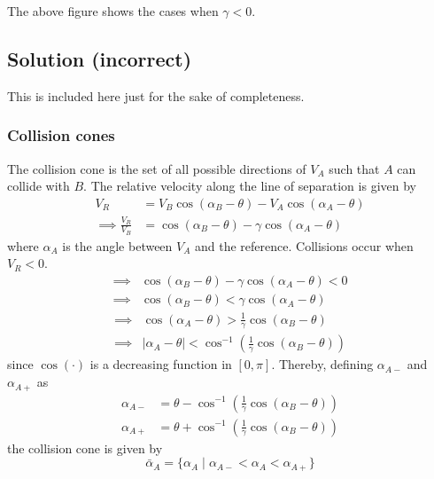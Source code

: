 The above figure shows the cases when \( \gamma < 0 \).

\clearpage
\subsection*{Solution (incorrect)}

This is included here just for the sake of completeness.

\subsubsection*{Collision cones}

The collision cone is the set of all possible directions of \( V_A \) such that \( A \) can collide with \( B \).
The relative velocity along the line of separation is given by
\begin{align*}
      V_{R}
       & =
      V_B \cos (\alpha_B - \theta) - V_A \cos (\alpha_A - \theta)
      \\
      \implies
      \frac{V_R}{V_B}
       & =
      \cos (\alpha_B - \theta) - \gamma \cos (\alpha_A - \theta)
\end{align*}
where \( \alpha_A \) is the angle between \( V_A \) and the reference.
Collisions occur when \( V_R < 0 \).
\begin{align*}
      \implies &
      \cos (\alpha_B - \theta) - \gamma \cos (\alpha_A - \theta) < 0
      \\ \implies &
      \cos (\alpha_B - \theta) < \gamma \cos (\alpha_A - \theta)
\end{align*}
\begin{align*}
      \implies &
      \cos (\alpha_A - \theta) > \frac{1}{\gamma} \cos (\alpha_B - \theta)
      \\ \implies &
      \vert \alpha_A - \theta \vert < \cos^{-1} \left( \frac{1}{\gamma} \cos (\alpha_B - \theta) \right)
\end{align*}
since \( \cos(\cdot) \) is a decreasing function in \( [0, \pi] \). Thereby, defining \( \alpha_{A -} \) and \( \alpha_{A +} \) as
\begin{equation*}
      \boxed{
            \begin{aligned}
                  \alpha_{A -}
                   & =
                  \theta - \cos^{-1} \left( \frac{1}{\gamma} \cos (\alpha_B - \theta) \right)
                  \\
                  \alpha_{A +}
                   & =
                  \theta + \cos^{-1} \left( \frac{1}{\gamma} \cos (\alpha_B - \theta) \right)
            \end{aligned}
      }
\end{equation*}
the collision cone is given by
\begin{equation*}
      \boxed{
            \bar \alpha_A = \{ \alpha_A \mid \alpha_{A -} < \alpha_A < \alpha_{A +} \}
      }
\end{equation*}

